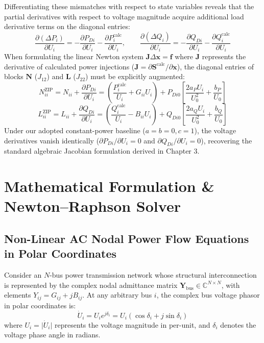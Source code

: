 \documentclass[12pt,a4paper,oneside]{report}
\begin{document}
\begin{enumerate}
\begin{equation}
    \end{equation}
    Differentiating these mismatches with respect to state variables reveals that the partial derivatives with respect to voltage magnitude acquire additional load derivative terms on the diagonal entries:
    \begin{equation}
    \frac{\partial (\Delta P_i)}{\partial U_i} = -\frac{\partial P_{Di}}{\partial U_i} - \frac{\partial P_i^{\text{calc}}}{\partial U_i}, \qquad \frac{\partial (\Delta Q_i)}{\partial U_i} = -\frac{\partial Q_{Di}}{\partial U_i} - \frac{\partial Q_i^{\text{calc}}}{\partial U_i}
    \end{equation}
    When formulating the linear Newton system $\mathbf{J} \Delta \mathbf{x} = \mathbf{f}$ where $\mathbf{J}$ represents the derivative of calculated power injections ($\mathbf{J} = \partial \mathbf{S}^{\text{calc}} / \partial \mathbf{x}$), the diagonal entries of blocks $\mathbf{N}$ ($J_{12}$) and $\mathbf{L}$ ($J_{22}$) must be explicitly augmented:
    \begin{equation}
    N_{ii}^{\text{ZIP}} = N_{ii} + \frac{\partial P_{Di}}{\partial U_i} = \left(\frac{P_i^{\text{calc}}}{U_i} + G_{ii} U_i\right) + P_{Di0} \left[ \frac{2 a_P U_i}{U_0^2} + \frac{b_P}{U_0} \right]
    \end{equation}
    \begin{equation}
    L_{ii}^{\text{ZIP}} = L_{ii} + \frac{\partial Q_{Di}}{\partial U_i} = \left(\frac{Q_i^{\text{calc}}}{U_i} - B_{ii} U_i\right) + Q_{Di0} \left[ \frac{2 a_Q U_i}{U_0^2} + \frac{b_Q}{U_0} \right]
    \end{equation}
    Under our adopted constant-power baseline ($a = b = 0, c = 1$), the voltage derivatives vanish identically ($\partial P_{Di}/\partial U_i = 0$ and $\partial Q_{Di}/\partial U_i = 0$), recovering the standard algebraic Jacobian formulation derived in Chapter 3.
\end{enumerate}

\chapter{Mathematical Formulation \& Newton--Raphson Solver}

\section{Non-Linear AC Nodal Power Flow Equations in Polar Coordinates}
Consider an $N$-bus power transmission network whose structural interconnection is represented by the complex nodal admittance matrix $\mathbf{Y}_{\text{bus}} \in \mathbb{C}^{N \times N}$, with elements $Y_{ij} = G_{ij} + jB_{ij}$. At any arbitrary bus $i$, the complex bus voltage phasor in polar coordinates is:
\begin{equation}
\dot{U}_i = U_i e^{j\delta_i} = U_i (\cos\delta_i + j\sin\delta_i)
\end{equation}
where $U_i = \vert{}\dot{U}_i\vert{}$ represents the voltage magnitude in per-unit, and $\delta_i$ denotes the voltage phase angle in radians.
\end{document}
